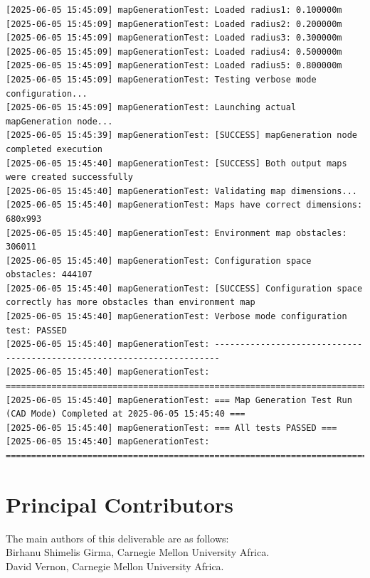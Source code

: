 \documentclass{CSSRforAfrica}
\newcommand{\blank}{~\\}
\begin{document}
\begin{landscape}
\begin{verbatim}
[2025-06-05 15:45:09] mapGenerationTest: Loaded radius1: 0.100000m
[2025-06-05 15:45:09] mapGenerationTest: Loaded radius2: 0.200000m
[2025-06-05 15:45:09] mapGenerationTest: Loaded radius3: 0.300000m
[2025-06-05 15:45:09] mapGenerationTest: Loaded radius4: 0.500000m
[2025-06-05 15:45:09] mapGenerationTest: Loaded radius5: 0.800000m
[2025-06-05 15:45:09] mapGenerationTest: Testing verbose mode configuration...
[2025-06-05 15:45:09] mapGenerationTest: Launching actual mapGeneration node...
[2025-06-05 15:45:39] mapGenerationTest: [SUCCESS] mapGeneration node completed execution
[2025-06-05 15:45:40] mapGenerationTest: [SUCCESS] Both output maps were created successfully
[2025-06-05 15:45:40] mapGenerationTest: Validating map dimensions...
[2025-06-05 15:45:40] mapGenerationTest: Maps have correct dimensions: 680x993
[2025-06-05 15:45:40] mapGenerationTest: Environment map obstacles: 306011
[2025-06-05 15:45:40] mapGenerationTest: Configuration space obstacles: 444107
[2025-06-05 15:45:40] mapGenerationTest: [SUCCESS] Configuration space correctly has more obstacles than environment map
[2025-06-05 15:45:40] mapGenerationTest: Verbose mode configuration test: PASSED
[2025-06-05 15:45:40] mapGenerationTest: -----------------------------------------------------------------------
[2025-06-05 15:45:40] mapGenerationTest: =======================================================================
[2025-06-05 15:45:40] mapGenerationTest: === Map Generation Test Run (CAD Mode) Completed at 2025-06-05 15:45:40 ===
[2025-06-05 15:45:40] mapGenerationTest: === All tests PASSED ===
[2025-06-05 15:45:40] mapGenerationTest: =======================================================================
\end{verbatim}
\end{landscape}  

\clearpage


 

\pagebreak
\section*{Principal Contributors}
\label{contributors}
The main authors of this deliverable are as follows:
\blank
Birhanu Shimelis Girma, Carnegie Mellon University Africa.\\
David Vernon, Carnegie Mellon University Africa.
\end{document}

